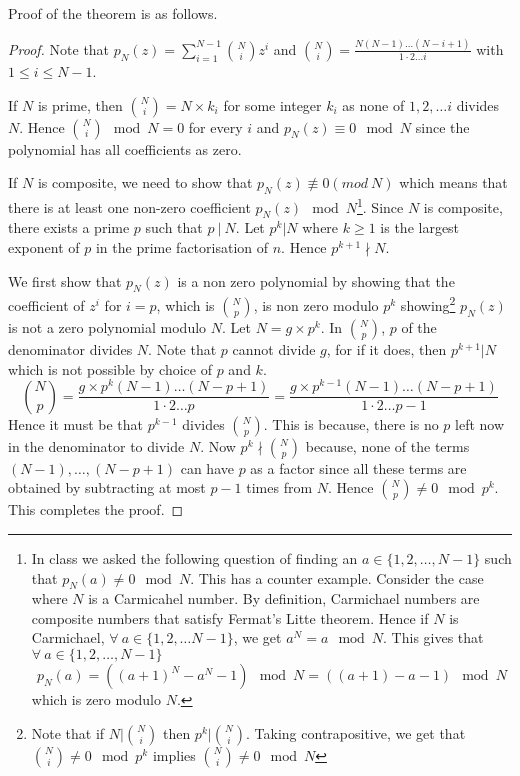 Proof of the theorem is as follows.
\begin{proof}
	Note that $p_N(z) = \sum_{i=1}^{N-1} \binom{N}{i} z^i$ and
	$\binom{N}{i} = \frac{N(N-1)\ldots (N-i+1)}{1\cdot 2 \ldots i}$ with $1
	\le i \le N-1$. 

	If $N$ is prime, then $\binom{N}{i} = N \times k_i$ for some integer
	$k_i$ as none of $1, 2, \ldots i$ divides $N$. Hence $\binom{N}{i}
	\mod N = 0$ for every $i$ and $p_N(z) \equiv 0 \mod N$ since the
	polynomial has all coefficients as zero.

	If $N$ is composite, we need to show that $p_N(z) \not 
	\equiv 0 (mod~ N)$ which means that there is at least one non-zero
	coefficient $p_N(z) \mod N$\footnote{In class we asked the following
		question of finding an $a \in \{1,2,\ldots, N-1\}$ such that
	$p_N(a) \ne 0 \mod N$. This has a counter example. Consider the case
	where $N$ is a Carmicahel number. By definition, Carmichael numbers
	are composite numbers that satisfy Fermat's Litte theorem.  Hence if
	$N$ is Carmichael,  $\forall~ a \in \{1,2,\ldots N-1 \}$, we get  $a^N
	= a \mod N$. This gives that $\forall~ a \in \{1,2,\ldots, N-1\}$
	\[	p_N(a)  = ((a+1)^N-a^N -1) \mod N = ((a+1)-a-1) \mod N \]
	which is zero modulo $N$.}. 	
	Since $N$ is composite, there exists a prime $p$ such that $p
	~|~ N$.  Let $p^k | N$ where $k \ge 1$ is the largest exponent of $p$
	in the prime factorisation of $n$. Hence $p^{k+1} \nmid N$.
	
	We first show that $p_N(z)$ is a non zero polynomial by showing that
	the coefficient of $z^i$ for $i = p$, which is $\binom{N}{p}$, is non
	zero modulo $p^k$ showing\footnote{Note that if
		$N|\binom{N}{i}$ then $p^k | \binom{N}{i}$. Taking
		contrapositive, we get that $\binom{N}{i} \not = 0 \mod p^k$
		implies $\binom{N}{i} \not = 0 \mod N$} $p_N(z)$ is not a zero
		polynomial modulo $N$. 
	Let $N = g \times p^k$. In $\binom{N}{p}$, $p$ of the denominator 
	divides $N$. Note that $p$ cannot divide $g$, for if it does, then
	$p^{k+1} | N$ which is not possible by choice of $p$ and $k$.
		\begin{equation}
		\binom{N}{p} = \frac{g\times p^k(N-1)\ldots (N-p+1)}
		{1\cdot 2 \ldots p} = \frac{g\times p^{k-1}(N-1)\ldots 
			\label{eq:ag-bis-proof}
		(N-p+1)}{1\cdot 2 \ldots p-1} \end{equation}
	Hence it must be that $p^{k-1}$ divides $\binom{N}{p}$. This is
	because, there is no $p$ left now in the denominator to divide $N$.
	Now $p^k \nmid \binom{N}{p}$ because, none of the terms $(N-1),
	\ldots,
	(N-p+1)$ can have $p$ as a factor since all these terms are obtained by
	subtracting at most $p-1$ times from $N$. Hence $\binom{N}{p} \ne 0
	\mod p^k$. This completes the proof.
\end{proof}

